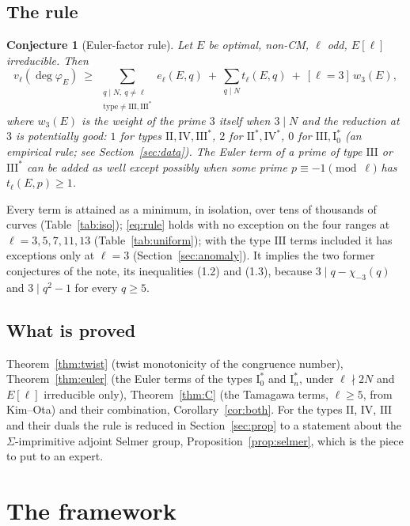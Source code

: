 \documentclass[11pt]{amsart}
\newtheorem{conjecture}[theorem]{Conjecture}
\theoremstyle{definition}
\newcommand{\degphi}{\deg\varphi_E}\newcommand{\Gal}{\operatorname{Gal}}\newcommand{\ad}{\operatorname{ad}^0}
\begin{document}
\subsection{The rule}
\begin{conjecture}[Euler-factor rule]\label{conj:euler}
Let $E$ be optimal, non-CM, $\ell$ odd, $E[\ell]$ irreducible. Then
\begin{equation}\label{eq:rule}
v_\ell(\degphi)\ \ge\ \sum_{\substack{q\mid N,\ q\ne\ell\\ \text{type}\ne\mathrm{III},\mathrm{III}^*}}e_\ell(E,q)\ +\ \sum_{q\mid N}t_\ell(E,q)\ +\ [\ell=3]\,w_3(E),
\end{equation}
where $w_3(E)$ is the weight of the prime $3$ itself when $3\mid N$ and the reduction at $3$ is potentially good: $1$ for types $\mathrm{II},\mathrm{IV},\mathrm{III}^*$, $2$ for $\mathrm{II}^*,\mathrm{IV}^*$, $0$ for $\mathrm{III},\mathrm{I}_0^*$ (an empirical rule; see Section~\ref{sec:data}). The Euler term of a prime of type $\mathrm{III}$ or $\mathrm{III}^*$ can be added as well except possibly when some prime $p\equiv-1\pmod\ell$ has $t_\ell(E,p)\ge1$.
\end{conjecture}

Every term is attained as a minimum, in isolation, over tens of thousands of curves (Table~\ref{tab:iso}); \eqref{eq:rule} holds with no exception on the four ranges at $\ell=3,5,7,11,13$ (Table~\ref{tab:uniform}); with the type $\mathrm{III}$ terms included it has exceptions only at $\ell=3$ (Section~\ref{sec:anomaly}). It implies the two former conjectures of the note, its inequalities (1.2) and (1.3), because $3\mid q-\chi_{-3}(q)$ and $3\mid q^2-1$ for every $q\ge5$.

\subsection{What is proved}
Theorem~\ref{thm:twist} (twist monotonicity of the congruence number), Theorem~\ref{thm:euler} (the Euler terms of the types $\mathrm{I}_0^*$ and $\mathrm{I}_n^*$, under $\ell\nmid 2N$ and $E[\ell]$ irreducible only), Theorem~\ref{thm:C} (the Tamagawa terms, $\ell\ge5$, from Kim--Ota) and their combination, Corollary~\ref{cor:both}. For the types $\mathrm{II}$, $\mathrm{IV}$, $\mathrm{III}$ and their duals the rule is reduced in Section~\ref{sec:prop} to a statement about the $\Sigma$-imprimitive adjoint Selmer group, Proposition~\ref{prop:selmer}, which is the piece to put to an expert.

\section{The framework}\label{sec:framework}
\end{document}
